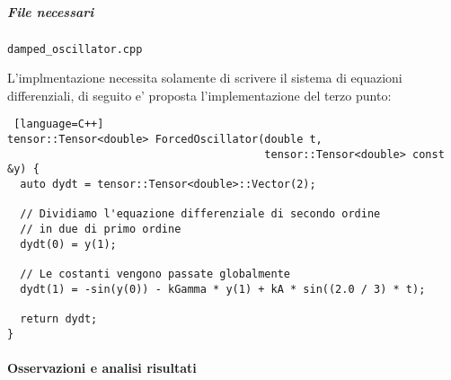 \subparagraph{File necessari} \texttt{damped\_oscillator.cpp}

L'implmentazione necessita solamente di scrivere il sistema di equazioni differenziali, di seguito e' proposta l'implementazione del terzo punto:

\begin{lstlisting} [language=C++]
tensor::Tensor<double> ForcedOscillator(double t,
                                        tensor::Tensor<double> const &y) {
  auto dydt = tensor::Tensor<double>::Vector(2);

  // Dividiamo l'equazione differenziale di secondo ordine 
  // in due di primo ordine
  dydt(0) = y(1);

  // Le costanti vengono passate globalmente
  dydt(1) = -sin(y(0)) - kGamma * y(1) + kA * sin((2.0 / 3) * t);

  return dydt;
}
\end{lstlisting}

\paragraph{Osservazioni e analisi risultati}

